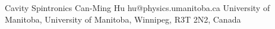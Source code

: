 \begin{conf-abstract}[]
{Cavity Spintronics}
{\color{blue} Can-Ming Hu}
{hu@physics.umanitoba.ca}
{University of Manitoba, University of Manitoba, Winnipeg, R3T 2N2, Canada}
{\decofourleft \decofourright}





\printbibliography[heading=none]

\end{conf-abstract}
